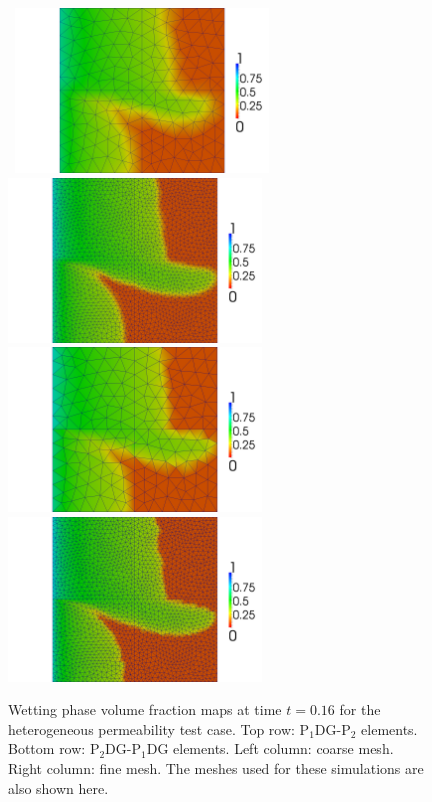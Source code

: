 \documentclass[preprint,authoryear,12pt]{elsarticle}
\newcommand{\PN}[2][error]{P$_{#1}$DG-P$_{#2}$}
\begin{document}
\begin{figure}[h!]
  \vbox{\hbox{
      \hspace{-1.8cm}\includegraphics[width=0.6\textwidth]{CG_coarse083.png}
      \hspace{-0.2cm}\includegraphics[width=0.6\textwidth]{CG_fine083.png}}
    \vspace{1.cm}\hbox{
      \hspace{-1.8cm}\includegraphics[width=0.6\textwidth]{DG_coarse083.png}
      \hspace{-0.2cm}\includegraphics[width=0.6\textwidth]{DG_fine083.png}}}
  \caption{Wetting phase volume fraction maps at time $t=0.16$ for the
    heterogeneous permeability test case. Top row: \PN[1]{2}
    elements. Bottom row: \PN[2]{1}DG elements. Left column: coarse
    mesh. Right column: fine mesh. The meshes used for these
    simulations are also shown here.\label{fig:4reg_maps}}
\end{figure}
\end{document}
